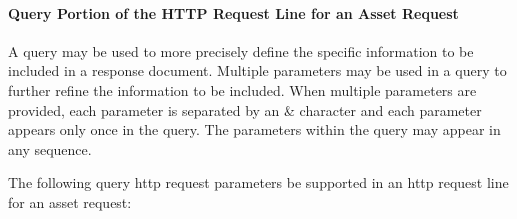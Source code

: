 \documentclass{mtconnect}	%
\begin{document}
\paragraph{Query Portion of the HTTP Request Line for an Asset Request}\mbox{}

A \gls{query} may be used to more precisely define the specific information to be included in a \gls{response document}.   Multiple parameters may be used in a \gls{query} to further refine the information to be included.  When multiple parameters are provided, each parameter is separated by an \& character and each parameter appears only once in the \gls{query}.  The parameters within the \gls{query} may appear in any sequence.

The following \gls{query http request} parameters \MUST be supported in an \gls{http request line} for an \gls{asset request}:
\end{document}

